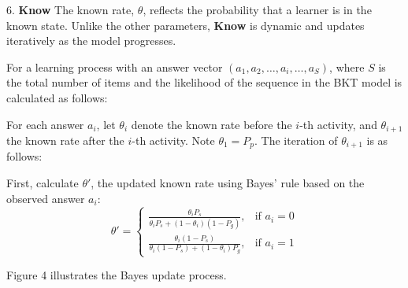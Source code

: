 \documentclass{article}
\begin{document}
6. \textbf{Know}  
The known rate, \( \theta \), reflects the probability that a learner is in the known state. Unlike the other parameters, \textbf{Know} is dynamic and updates iteratively as the model progresses.

For a learning process with an answer vector \( (a_1, a_2, \dots, a_i, \dots, a_S) \), where $S$ is the total number of items and the likelihood of the sequence in the BKT model is calculated as follows:

For each answer \( a_i \), let \(\theta_{i}\) denote the known rate before the \(i\)-th activity, and \(\theta_{i+1}\) the known rate after the \(i\)-th activity. Note \(\theta_1 = P_p\). The iteration of \(\theta_{i+1}\) is as follows:

First, calculate \(\theta'\), the updated known rate using Bayes' rule based on the observed answer \( a_i \):
\[
\theta' = 
\begin{cases} 
    \frac{\theta_{i} P_s}{\theta_{i} P_s + (1 - \theta_{i}) (1 - P_g)}, & \text{if } a_i = 0 \\[10pt]
    \frac{\theta_{i} (1 - P_s)}{\theta_{i} (1 - P_s) + (1 - \theta_{i}) P_g}, & \text{if } a_i = 1 
\end{cases}
\]

Figure 4 illustrates the Bayes update process.

\begin{center}
\end{center}
\end{document}
